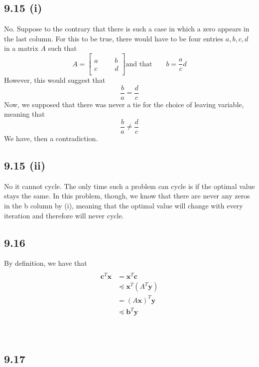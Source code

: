 \documentclass[letterpaper,12pt]{article}
\theoremstyle{definition}
\begin{document}
\subsection*{9.15 (i)}
No. Suppose to the contrary that there is such a case in which a zero appears in the last column. For this to be true, there would have to be four entries $a,b,c,d$ in a matrix $A$ such that
\[A = 
\begin{bmatrix}
    & & & \\
    a & & & b\\
    c & & & d\\
\end{bmatrix}
\text{and that}\qquad
b = \frac{a}{c}d
\]
However, this would suggest that \[\frac{b}{a} = \frac{d}{c}\]
Now, we supposed that there was never a tie for the choice of leaving variable, meaning that \[\frac{b}{a} \neq \frac{d}{c} \]
We have, then a contradiction. 

\subsection*{9.15 (ii)}
No it cannot cycle. The only time such a problem can cycle is if the optimal value stays the same. In this problem, though, we know that there are never any zeros in the b column by (i), meaning that the optimal value will change with every iteration and therefore will never cycle.

\subsection*{9.16}

By definition, we have that
\begin{align*}
\\ \textbf{c}^T \textbf{x} &= \textbf{x}^T \textbf{c}
\\ &\preceq \textbf{x}^T(A^T\textbf{y})
\\ &= (A\textbf{x})^T \textbf{y}
\\ &\preceq \textbf{b}^T \textbf{y}
\end{align*}
\\
\\
\subsection*{9.17}
\end{document}

